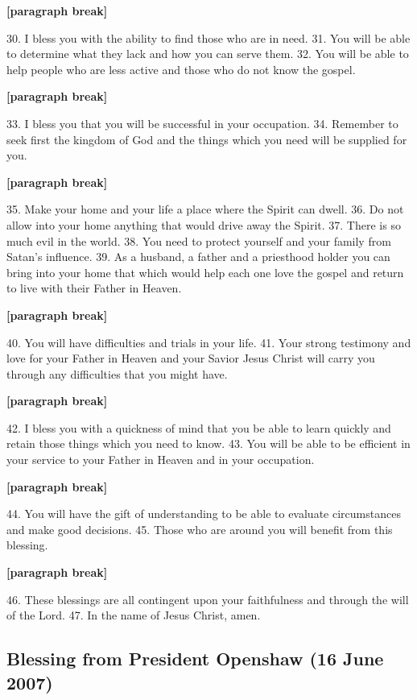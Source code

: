 			\textbf{[paragraph break]}

			30. I bless you with the ability to find those who are in need.
			31. You will be able to determine what they lack and how you can serve them.
			32. You will be able to help people who are less active and those who do not know the gospel.

			\textbf{[paragraph break]}

			33. I bless you that you will be successful in your occupation.
			34. Remember to seek first the kingdom of God and the things which you need will be supplied for you.

			\textbf{[paragraph break]}

			35. Make your home and your life a place where the Spirit can dwell.
			36. Do not allow into your home anything that would drive away the Spirit.
			37. There is so much evil in the world.
			38. You need to protect yourself and your family from Satan's influence.
			39. As a husband, a father and a priesthood holder you can bring into your home that which would help each one love the gospel and return to live with their Father in Heaven.

			\textbf{[paragraph break]}

			40. You will have difficulties and trials in your life.
			41. Your strong testimony and love for your Father in Heaven and your Savior Jesus Christ will carry you through any difficulties that you might have.

			\textbf{[paragraph break]}

			42. I bless you with a quickness of mind that you be able to learn quickly and retain those things which you need to know.
			43. You will be able to be efficient in your service to your Father in Heaven and in your occupation.

			\textbf{[paragraph break]}

			44. You will have the gift of understanding to be able to evaluate circumstances and make good decisions.
			45. Those who are around you will benefit from this blessing.

			\textbf{[paragraph break]}

			46. These blessings are all contingent upon your faithfulness and through the will of the Lord.
			47. In the name of Jesus Christ, amen.
			
	\subsection{Blessing from President Openshaw (16 June 2007)}
		\label{BLESSINGS-OPENSHAW}
		
